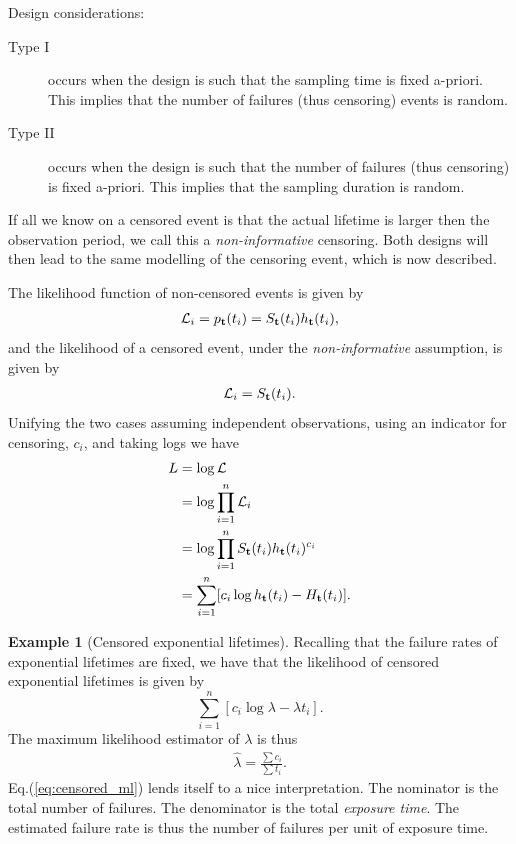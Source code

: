 \documentclass[12pt,a4paper]{report}
\theoremstyle{plain}
\theoremstyle{definition}
\newtheorem{example}{Example}
\newcommand{\estim}[1]{\widehat{#1}} \newcommand{\estimII}[1]{\tilde{#1}}
\begin{document}
Design considerations:
\begin{description}
\item [Type I] occurs when the design is such that the sampling time is fixed a-priori. This implies that the number of failures (thus censoring) events is random. 
\item [Type II] occurs when the design is such that the number of failures (thus censoring) is fixed a-priori. This implies that the sampling duration is random.
\end{description}
If all we know on a censored event is that the actual lifetime is larger then the observation period, we call this a \emph{non-informative} censoring. 
Both designs will then lead to the same modelling of the censoring event, which is now described.

The likelihood function of non-censored events is given by
\begin{align}
	\mathcal{L}_i=p_{\mathbf{t}}(t_i)= S_{\mathbf{t}} (t_i) h_{\mathbf{t}} (t_i),
\end{align}
and the likelihood of a censored event, under the \emph{non-informative} assumption, is given by 
\begin{align}
	\mathcal{L}_i=S_{\mathbf{t}} (t_i) .
\end{align}
Unifying the two cases assuming independent observations, using an indicator for censoring, $c_i$, and taking logs we have
\begin{align}
	L &=\log \mathcal{L}\\ 
	&= \log \prod_{i=1}^{n} \mathcal{L}_i \\
	&= \log \prod_{i=1}^{n} S_{\mathbf{t}} (t_i) h_{\mathbf{t}} (t_i)^{c_i} \\
	&= \sum_{i=1}^{n} [c_i \log h_{\mathbf{t}} (t_i) - H_{\mathbf{t}} (t_i)]. \label{eq:censored_likelihood}
\end{align}


\begin{example}[Censored exponential lifetimes]
Recalling that the failure rates of exponential lifetimes are fixed, we have that the likelihood of censored exponential lifetimes is given by 
$$
	\sum_{i=1}^{n} [c_i \log \lambda - \lambda t_i].
$$
The maximum likelihood estimator of $\lambda$ is thus
\begin{align}
	\estim{\lambda}= \frac{\sum c_i}{\sum t_i}. \label{eq:censored_ml}
\end{align}
Eq.(\ref{eq:censored_ml}) lends itself to a nice interpretation.
The nominator is the total number of failures.
The denominator is the total \emph{exposure time}. 
The estimated failure rate is thus the number of failures per unit of exposure time. 
\end{example}
\end{document}
